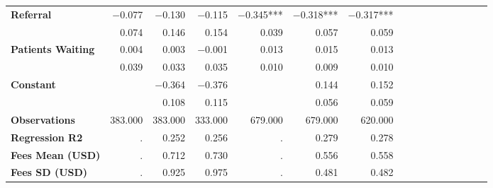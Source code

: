 \begin{tabular}{@{\extracolsep{5pt}}lrrrrrrrrrrrrrrr}
{\bf Referral} & $-$0.077\phantom{\phantom{)}***} & $-$0.130\phantom{\phantom{)}***} & $-$0.115\phantom{\phantom{)}***} & $-$0.345\phantom{)}*** & $-$0.318\phantom{)}*** & $-$0.317\phantom{)}*** \\
{\bf } & 0.074\phantom{\phantom{)}***} & 0.146\phantom{\phantom{)}***} & 0.154\phantom{\phantom{)}***} & 0.039\phantom{\phantom{)}***} & 0.057\phantom{\phantom{)}***} & 0.059\phantom{\phantom{)}***} \\
{\bf Patients Waiting} & 0.004\phantom{\phantom{)}***} & 0.003\phantom{\phantom{)}***} & $-$0.001\phantom{\phantom{)}***} & 0.013\phantom{\phantom{)}***} & 0.015\phantom{\phantom{)}***} & 0.013\phantom{\phantom{)}***} \\
{\bf } & 0.039\phantom{\phantom{)}***} & 0.033\phantom{\phantom{)}***} & 0.035\phantom{\phantom{)}***} & 0.010\phantom{\phantom{)}***} & 0.009\phantom{\phantom{)}***} & 0.010\phantom{\phantom{)}***} \\
{\bf Constant} & \phantom{***} & $-$0.364\phantom{\phantom{)}***} & $-$0.376\phantom{\phantom{)}***} & \phantom{***} & 0.144\phantom{\phantom{)}***} & 0.152\phantom{\phantom{)}***} \\
{\bf } & \phantom{***} & 0.108\phantom{\phantom{)}***} & 0.115\phantom{\phantom{)}***} & \phantom{***} & 0.056\phantom{\phantom{)}***} & 0.059\phantom{\phantom{)}***} \\
{\bf Observations} & 383.000\phantom{\phantom{)}***} & 383.000\phantom{\phantom{)}***} & 333.000\phantom{\phantom{)}***} & 679.000\phantom{\phantom{)}***} & 679.000\phantom{\phantom{)}***} & 620.000\phantom{\phantom{)}***} \\
{\bf Regression R2} & .\phantom{***} & 0.252\phantom{***} & 0.256\phantom{***} & .\phantom{***} & 0.279\phantom{***} & 0.278\phantom{***} \\
{\bf Fees Mean (USD)} & .\phantom{***} & 0.712\phantom{***} & 0.730\phantom{***} & .\phantom{***} & 0.556\phantom{***} & 0.558\phantom{***} \\
{\bf Fees SD (USD)} & .\phantom{***} & 0.925\phantom{***} & 0.975\phantom{***} & .\phantom{***} & 0.481\phantom{***} & 0.482\phantom{***} \\
\hline
\end{tabular}
